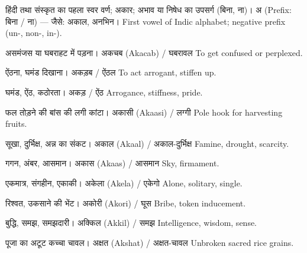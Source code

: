 
%
{हिंदी तथा संस्कृत का पहला स्वर वर्ण; अकार; अभाव या निषेध का उपसर्ग (बिना, ना)।}%
{अ (Prefix: बिना / ना) --- जैसे: अकाल, अनभिन।}%
{First vowel of Indic alphabet; negative prefix (un-, non-, in-).}

%
{असमंजस या घबराहट में पड़ना।}%
{अकचब (Akacab) / घबरावल}%
{To get confused or perplexed.}

%
{ऐंठना, घमंड दिखाना।}%
{अकड़ब / ऐंठल}%
{To act arrogant, stiffen up.}

%
{घमंड, ऐंठ, कठोरता।}%
{अकड़ / ऐंठ}%
{Arrogance, stiffness, pride.}

%
{फल तोड़ने की बांस की लगी कांटा।}%
{अकासी (Akaasi) / लग्गी}%
{Pole hook for harvesting fruits.}

%
{सूखा, दुर्भिक्ष, अन्न का संकट।}%
{अकाल (Akaal) / अकाल-दुर्भिक्ष}%
{Famine, drought, scarcity.}

%
{गगन, अंबर, आसमान।}%
{अकास (Akaas) / आसमान}%
{Sky, firmament.}

%
{एकमात्र, संगहीन, एकाकी।}%
{अकेला (Akela) / एकेगो}%
{Alone, solitary, single.}

%
{रिश्वत, उकसाने की भेंट।}%
{अकोरी (Akori) / घूस}%
{Bribe, token inducement.}

%
{बुद्धि, समझ, समझदारी।}%
{अक्किल (Akkil) / समझ}%
{Intelligence, wisdom, sense.}

%
{पूजा का अटूट कच्चा चावल।}%
{अक्षत (Akshat) / अक्षत-चावल}%
{Unbroken sacred rice grains.}

